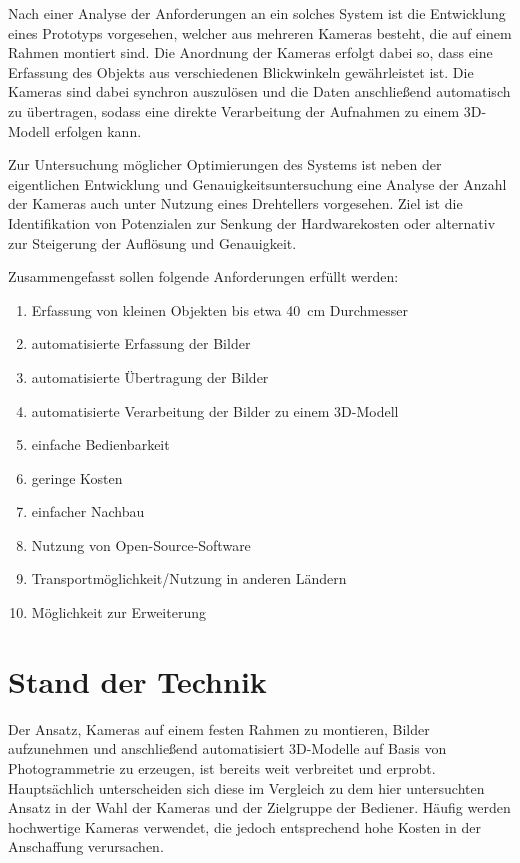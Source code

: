 \documentclass[./00PhotoBox]{subfiles}
\begin{document}
Nach einer Analyse der Anforderungen an ein solches System ist die Entwicklung eines Prototyps vorgesehen, welcher aus mehreren Kameras besteht, die auf einem Rahmen montiert sind. Die Anordnung der Kameras erfolgt dabei so, dass eine Erfassung des Objekts aus verschiedenen Blickwinkeln gewährleistet ist. Die Kameras sind dabei synchron auszulösen und die Daten anschließend automatisch zu übertragen, sodass eine direkte Verarbeitung der Aufnahmen zu einem 3D-Modell erfolgen kann.

Zur Untersuchung möglicher Optimierungen des Systems ist neben der eigentlichen Entwicklung und Genauigkeitsuntersuchung eine Analyse der Anzahl der Kameras auch unter Nutzung eines Drehtellers vorgesehen. Ziel ist die Identifikation von Potenzialen zur Senkung der Hardwarekosten oder alternativ zur Steigerung der Auflösung und Genauigkeit.

Zusammengefasst sollen folgende Anforderungen erfüllt werden:

\begin{enumerate}
    \item Erfassung von kleinen Objekten bis etwa \SI{40}{\centi\metre} Durchmesser
    \item automatisierte Erfassung der Bilder
    \item automatisierte Übertragung der Bilder
    \item automatisierte Verarbeitung der Bilder zu einem 3D-Modell
    \item einfache Bedienbarkeit
    \item geringe Kosten
    \item einfacher Nachbau
    \item Nutzung von Open-Source-Software
    \item Transportmöglichkeit/Nutzung in anderen Ländern
    \item Möglichkeit zur Erweiterung
\end{enumerate}

\section{Stand der Technik}
Der Ansatz, Kameras auf einem festen Rahmen zu montieren, Bilder aufzunehmen und anschließend automatisiert 3D-Modelle auf Basis von Photogrammetrie zu erzeugen, ist bereits weit verbreitet und erprobt. Hauptsächlich unterscheiden sich diese im Vergleich zu dem hier untersuchten Ansatz in der Wahl der Kameras und der Zielgruppe der Bediener. Häufig werden hochwertige Kameras verwendet, die jedoch entsprechend hohe Kosten in der Anschaffung verursachen.
\end{document}
